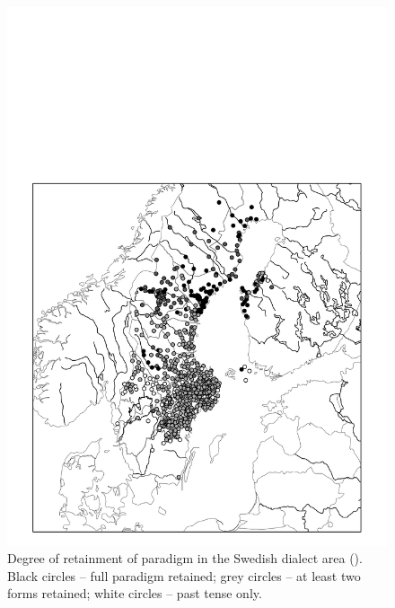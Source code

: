 \begin{figure}[h]
\includegraphics[height=.5\textheight]{figures/35_RetainmentofVarda}
\caption{Degree of retainment of  paradigm in the Swedish dialect area (\citealt{Markey1969}). Black circles – full paradigm retained; grey circles – at least two forms retained; white circles – past tense only. }
\label{map:31}
\end{figure}


